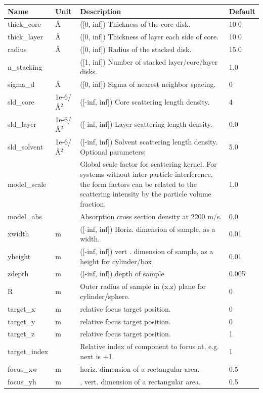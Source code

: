 \begin{longtable}{p{}p{}p{}p{}}
\toprule
\textbf{Name} & \textbf{Unit} & \textbf{Description} & \textbf{Default} \\
\midrule
\endhead
thick\_core & \AA{} & ([0, inf]) Thickness of the core disk. & 10.0 \\
thick\_layer & \AA{} & ([0, inf]) Thickness of layer each side of core. & 10.0 \\
radius & \AA{} & ([0, inf]) Radius of the stacked disk. & 15.0 \\
n\_stacking &  & ([1, inf]) Number of stacked layer/core/layer disks. & 1.0 \\
sigma\_d & \AA{} & ([0, inf]) Sigma of nearest neighbor spacing. & 0 \\
sld\_core & 1e-6/\AA{}$^{2}$ & ([-inf, inf]) Core scattering length density. & 4 \\
sld\_layer & 1e-6/\AA{}$^{2}$ & ([-inf, inf]) Layer scattering length density. & 0.0 \\
sld\_solvent & 1e-6/\AA{}$^{2}$ & ([-inf, inf]) Solvent scattering length density. Optional parameters: & 5.0 \\
model\_scale &   & Global scale factor for scattering kernel. For systems without inter-particle interference, the form factors can be related to the scattering intensity by the particle volume fraction. & 1.0 \\
model\_abs &   & Absorption cross section density at 2200 m/s. & 0.0 \\
xwidth & m & ([-inf, inf]) Horiz. dimension of sample, as a width. & 0.01 \\
yheight & m & ([-inf, inf]) vert . dimension of sample, as a height for cylinder/box & 0.01 \\
zdepth & m & ([-inf, inf]) depth of sample & 0.005 \\
R & m & Outer radius of sample in (x,z) plane for cylinder/sphere. & 0 \\
target\_x & m & relative focus target position. & 0 \\
target\_y & m & relative focus target position. & 0 \\
target\_z & m & relative focus target position. & 1 \\
target\_index &   & Relative index of component to focus at, e.g. next is +1. & 1 \\
focus\_xw & m & horiz. dimension of a rectangular area. & 0.5 \\
focus\_yh & m & , vert. dimension of a rectangular area. & 0.5 \\

\end{longtable}

